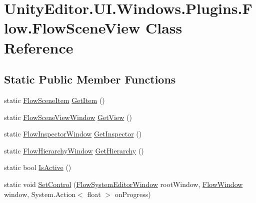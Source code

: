 \hypertarget{class_unity_editor_1_1_u_i_1_1_windows_1_1_plugins_1_1_flow_1_1_flow_scene_view}{}\section{Unity\+Editor.\+U\+I.\+Windows.\+Plugins.\+Flow.\+Flow\+Scene\+View Class Reference}
\label{class_unity_editor_1_1_u_i_1_1_windows_1_1_plugins_1_1_flow_1_1_flow_scene_view}
\subsection*{Static Public Member Functions}
\begin{DoxyCompactItemize}
\item 
static \hyperlink{class_unity_editor_1_1_u_i_1_1_windows_1_1_plugins_1_1_flow_1_1_flow_scene_item}{Flow\+Scene\+Item} \hyperlink{class_unity_editor_1_1_u_i_1_1_windows_1_1_plugins_1_1_flow_1_1_flow_scene_view_a659fa0a8deb0b3e905577145abec0ff9}{Get\+Item} ()
\item 
static \hyperlink{class_unity_editor_1_1_u_i_1_1_windows_1_1_plugins_1_1_flow_1_1_editors_1_1_flow_scene_view_window}{Flow\+Scene\+View\+Window} \hyperlink{class_unity_editor_1_1_u_i_1_1_windows_1_1_plugins_1_1_flow_1_1_flow_scene_view_a59d8f7e4dc71300cac32dcf369f33f82}{Get\+View} ()
\item 
static \hyperlink{class_unity_editor_1_1_u_i_1_1_windows_1_1_plugins_1_1_flow_1_1_editors_1_1_flow_inspector_window}{Flow\+Inspector\+Window} \hyperlink{class_unity_editor_1_1_u_i_1_1_windows_1_1_plugins_1_1_flow_1_1_flow_scene_view_ab34ad80c06dbeca968634c6d71c3d90e}{Get\+Inspector} ()
\item 
static \hyperlink{class_unity_editor_1_1_u_i_1_1_windows_1_1_plugins_1_1_flow_1_1_editors_1_1_flow_hierarchy_window}{Flow\+Hierarchy\+Window} \hyperlink{class_unity_editor_1_1_u_i_1_1_windows_1_1_plugins_1_1_flow_1_1_flow_scene_view_aeedaa6de4e4d096defb6b573c7369c7a}{Get\+Hierarchy} ()
\item 
static bool \hyperlink{class_unity_editor_1_1_u_i_1_1_windows_1_1_plugins_1_1_flow_1_1_flow_scene_view_ac5516977a1a6e210693849f61ff9fcf7}{Is\+Active} ()
\item 
static void \hyperlink{class_unity_editor_1_1_u_i_1_1_windows_1_1_plugins_1_1_flow_1_1_flow_scene_view_a17fea1d57ab3e3a35f768b2d221e605c}{Set\+Control} (\hyperlink{class_unity_editor_1_1_u_i_1_1_windows_1_1_plugins_1_1_flow_1_1_flow_system_editor_window}{Flow\+System\+Editor\+Window} root\+Window, \hyperlink{class_unity_engine_1_1_u_i_1_1_windows_1_1_plugins_1_1_flow_1_1_flow_window}{Flow\+Window} window, System.\+Action$<$ float $>$ on\+Progress)

\end{DoxyCompactItemize}
